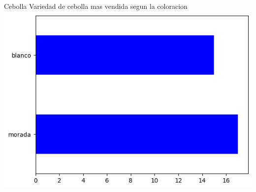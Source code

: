 \documentclass{beamer}
\begin{document}
 \begin{frame}{Cebolla}
    Variedad de cebolla mas vendida segun la coloracion
    \includegraphics[scale=0.5]{Ceb_mas_vendida.png}
    \end{frame}   

    
\end{document}
